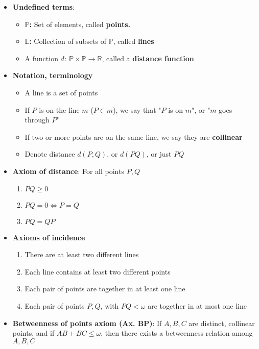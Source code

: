 \documentclass{report}
\begin{document}
\begin{itemize}
        \item \textbf{Undefined terms}: 
            \begin{itemize}
                \item \textbf{$\mathbb{P}$:} Set of elements, called \textbf{points.}
                \item \textbf{$\mathbb{L}$:} Collection of subsets of $\mathbb{P}$, called \textbf{lines}
                \item A function $d:\ \mathbb{P}\times \mathbb{P} \to \mathbb{R} $, called a \textbf{distance function}
            \end{itemize}
        \item \textbf{Notation, terminology}
        \begin{itemize}
            \item A line is a set of points
            \item If $P$ is on the line $m$ ($P\in m$), we say that "$P$ is on $m$", or "$m$ goes through $P$"
            \item If two or more points are on the same line, we say they are \textbf{collinear}
            \item Denote distance $d(P,Q)$, or $d(PQ)$, or just $PQ$
        \end{itemize}
    \item         \textbf{Axiom of distance}: For all points $P,Q$
        \begin{enumerate}
            \item $PQ \geq 0 $
            \item $PQ = 0 \iff P=Q $
            \item $PQ = QP $
        \end{enumerate}
    \item         \textbf{Axioms of incidence}
        \begin{enumerate}
            \item There are at least two different lines
            \item Each line contains at least two different points
            \item Each pair of points are together in at least one line
            \item Each pair of points $P,Q$, with $PQ < \omega$ are together in at most one line
        \end{enumerate}
    \item \textbf{Betweenness of points axiom (Ax. BP)}: If $A,B,C$ are distinct, collinear points, and if $AB + BC \leq \omega$, then there exists a betweenness relation among $A,B,C$

\end{itemize}
\end{document}
